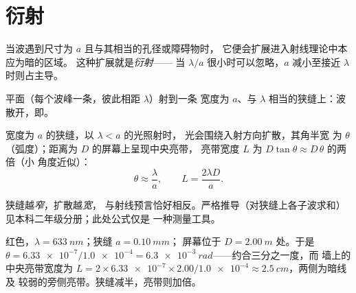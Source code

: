 \section{衍射}

\begin{definition}[衍射]\label{def:g12:light-as-wave:diffraction}
当波遇到尺寸为 $a$ 且与其相当的孔径或障碍物时，
它便会扩展进入射线理论中本应为暗的区域。
这种扩展就是\emph{衍射}——
当 $\lambda/a$ 很小时可以忽略，$a$ 减小至接近 $\lambda$ 时则占主导。
\end{definition}

\begin{omfigure}

{\small 平面（每个波峰一条，彼此相距 $\lambda$）射到一条
宽度为 $a$、与 $\lambda$ 相当的狭缝上：波散开，即。}
\end{omfigure}

\begin{proposition}[扩散的角半宽]\label{prop:g12:light-as-wave:halfwidth}
宽度为 $a$ 的狭缝，以 $\lambda < a$ 的光照射时，
光会围绕入射方向扩散，其角半宽
为 $\theta$（弧度）；距离为 $D$ 的屏幕上呈现中央亮带，
亮带宽度 $L$ 为 $D \tan\theta \approx D\,\theta$ 的两倍（小
角度近似）：
\[
\theta \approx \frac{\lambda}{a}, \qquad L = \frac{2\lambda D}{a}.
\]
\end{proposition}
\admitted

\begin{remark}[反过来看公式]\label{rem:g12:light-as-wave:honest}
狭缝越\emph{窄}，扩散越\emph{宽}，
与射线预言恰好相反。严格推导（对狭缝上各子波求和）
见本科二年级分册；此处公式仅是
一种测量工具。
\end{remark}

\begin{example}[激光通过狭缝]\label{ex:g12:light-as-wave:slit}
红色，$\lambda = \qty{633}{nm}$；狭缝 $a = \qty{0.10}{mm}$；
屏幕位于 $D = \qty{2.00}{m}$ 处。于是 $\theta = \num{6.33e-7} /
\num{1.0e-4} = \qty{6.3e-3}{rad}$——约合三分之一度，而
墙上的中央亮带宽度为 $L = 2 \times \num{6.33e-7} \times 2.00 /
\num{1.0e-4} \approx \qty{2.5}{cm}$，两侧为暗线及
较弱的旁侧亮带。狭缝减半，亮带则加倍。
\end{example}

